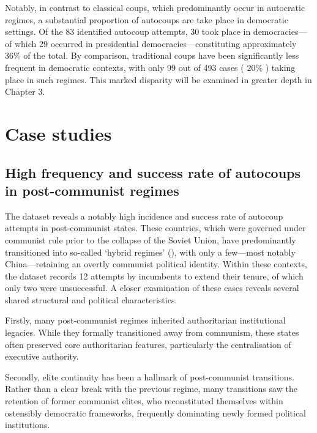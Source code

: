\documentclass[
  12pt,
]{report}
\begin{document}
Notably, in contrast to classical coups, which predominantly occur in
autocratic regimes, a substantial proportion of autocoups are take place
in democratic settings. Of the 83 identified autocoup attempts, 30 took
place in democracies---of which 29 occurred in presidential
democracies---constituting approximately \(36\%\) of the total. By
comparison, traditional coups have been significantly less frequent in
democratic contexts, with only 99 out of 493 cases ( \(20\%\) ) taking
place in such regimes. This marked disparity will be examined in greater
depth in Chapter 3.

\section{Case studies}\label{case-studies}

\subsection*{High frequency and success rate of autocoups in
post-communist
regimes}\label{high-frequency-and-success-rate-of-autocoups-in-post-communist-regimes}

The dataset reveals a notably high incidence and success rate of
autocoup attempts in post-communist states. These countries, which were
governed under communist rule prior to the collapse of the Soviet Union,
have predominantly transitioned into so-called `hybrid regimes'
(), with only a
few---most notably China---retaining an overtly communist political
identity. Within these contexts, the dataset records 12 attempts by
incumbents to extend their tenure, of which only two were unsuccessful.
A closer examination of these cases reveals several shared structural
and political characteristics.

Firstly, many post-communist regimes inherited authoritarian
institutional legacies. While they formally transitioned away from
communism, these states often preserved core authoritarian features,
particularly the centralisation of executive authority.

Secondly, elite continuity has been a hallmark of post-communist
transitions. Rather than a clear break with the previous regime, many
transitions saw the retention of former communist elites, who
reconstituted themselves within ostensibly democratic frameworks,
frequently dominating newly formed political institutions.
\end{document}
